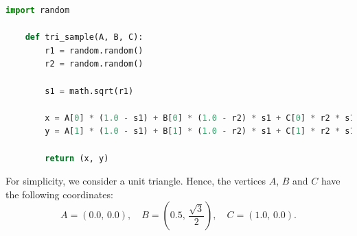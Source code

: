 \documentclass{article}
\begin{document}
\begin{lstlisting}[language=Python, caption=Sampling a point inside a triangle.]
    import random

    def tri_sample(A, B, C):
        r1 = random.random()
        r2 = random.random()
    
        s1 = math.sqrt(r1)
    
        x = A[0] * (1.0 - s1) + B[0] * (1.0 - r2) * s1 + C[0] * r2 * s1
        y = A[1] * (1.0 - s1) + B[1] * (1.0 - r2) * s1 + C[1] * r2 * s1
    
        return (x, y)    
\end{lstlisting}

For simplicity, we consider a unit triangle.
Hence, the vertices $A$, $B$ and $C$ have the following coordinates:
\begin{equation*}
    A = (0.0,\, 0.0),\quad B = \left(0.5,\, \frac{\sqrt{3}}{2}\right),\quad C = (1.0,\, 0.0).
\end{equation*}
\end{document}
